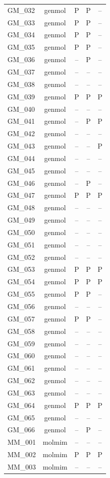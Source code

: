 \documentclass{article}
\begin{document}
\begin{longtable}{lcccc}
GM\_032 & genmol & P & P & -- \\
GM\_033 & genmol & P & P & -- \\
GM\_034 & genmol & P & P & -- \\
GM\_035 & genmol & P & P & -- \\
GM\_036 & genmol & -- & P & -- \\
GM\_037 & genmol & -- & -- & -- \\
GM\_038 & genmol & -- & -- & -- \\
GM\_039 & genmol & P & P & P \\
GM\_040 & genmol & -- & -- & -- \\
GM\_041 & genmol & -- & P & P \\
GM\_042 & genmol & -- & -- & -- \\
GM\_043 & genmol & -- & -- & P \\
GM\_044 & genmol & -- & -- & -- \\
GM\_045 & genmol & -- & -- & -- \\
GM\_046 & genmol & -- & P & -- \\
GM\_047 & genmol & P & P & P \\
GM\_048 & genmol & -- & -- & -- \\
GM\_049 & genmol & -- & -- & -- \\
GM\_050 & genmol & -- & -- & -- \\
GM\_051 & genmol & -- & -- & -- \\
GM\_052 & genmol & -- & -- & -- \\
GM\_053 & genmol & P & P & P \\
GM\_054 & genmol & P & P & P \\
GM\_055 & genmol & P & P & -- \\
GM\_056 & genmol & -- & -- & -- \\
GM\_057 & genmol & P & P & -- \\
GM\_058 & genmol & -- & -- & -- \\
GM\_059 & genmol & -- & -- & -- \\
GM\_060 & genmol & -- & -- & -- \\
GM\_061 & genmol & -- & -- & -- \\
GM\_062 & genmol & -- & -- & -- \\
GM\_063 & genmol & -- & -- & -- \\
GM\_064 & genmol & P & P & P \\
GM\_065 & genmol & -- & -- & -- \\
GM\_066 & genmol & -- & P & -- \\
MM\_001 & molmim & -- & -- & -- \\
MM\_002 & molmim & P & P & P \\
MM\_003 & molmim & -- & -- & -- \\
\bottomrule
\end{longtable}
\end{document}
